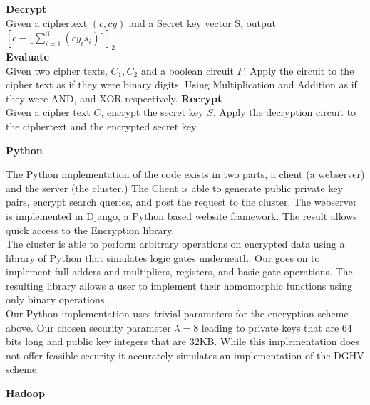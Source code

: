 \documentclass[11pt]{article}
\begin{document}
\textbf{Decrypt}\\
	Given a ciphertext $(c,cy)$ and a Secret key vector S, output $[c-\lfloor \sum\limits_{i=1}^\beta (cy_is_i) \rceil ]_2$\\
\textbf{Evaluate}\\
Given two cipher texts, $C_1, C_2$ and a boolean circuit $F$. Apply the circuit to the cipher text as if they were binary digits. Using Multiplication and Addition as if they were AND, and XOR respectively. 
\textbf{Recrypt}\\
Given a cipher text $C$, encrypt the secret key $S$. Apply the decryption circuit to the ciphertext and the encrypted secret key.
\\
\begin{center}
\textbf{Python}
\end{center}
The Python implementation of the code exists in two parts, a client (a webserver) and the server (the cluster.) The Client is able to generate public private key pairs, encrypt search queries, and post the request to the cluster. The webserver is implemented in Django, a Python based website framework. The result allows quick access to the Encryption library.\\

The cluster is able to perform arbitrary operations on encrypted data using a library of Python that simulates logic gates underneath. Our goes on to implement full adders and multipliers, registers, and basic gate operations. The resulting library allows a user to implement their homomorphic functions using only binary operations.\\

Our Python implementation uses trivial parameters for the encryption scheme above. Our chosen security parameter $\lambda=8$ leading to private keys that are 64 bits long and public key integers that are 32KB. While this implementation does not offer feasible security it accurately simulates an implementation of the DGHV scheme.

\begin{center}
\textbf{Hadoop}
\end{center}
\end{document}
